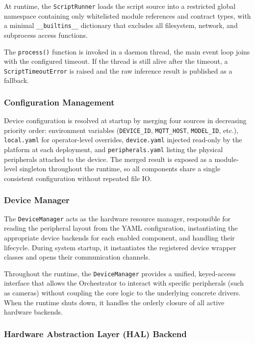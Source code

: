 At runtime, the \texttt{ScriptRunner} loads the script source into a restricted global namespace containing only whitelisted module references and contract types, with a minimal \texttt{\_\_builtins\_\_} dictionary that excludes all filesystem, network, and subprocess access functions. 

The \texttt{process()} function is invoked in a daemon thread, the main event loop joins with the configured timeout. If the thread is still alive after the timeout, a \texttt{ScriptTimeoutError} is raised and the raw inference result is published as a fallback.

\subsubsection{Configuration Management}\label{sec:impl:config}

Device configuration is resolved at startup by merging four sources in decreasing priority order: environment variables (\texttt{DEVICE\_ID}, \texttt{MQTT\_HOST}, \texttt{MODEL\_ID}, etc.), \texttt{local.yaml} for operator-level overrides, \texttt{device.yaml} injected read-only by the platform at each deployment, and \texttt{peripherals.yaml} listing the physical peripherals attached to the device. The merged result is exposed as a module-level singleton throughout the runtime, so all components share a single consistent configuration without repeated file \gls{IO}.

\subsubsection{Device Manager}\label{sec:impl:device_manager}

The \texttt{DeviceManager} acts as the hardware resource manager, responsible for reading the peripheral layout from the YAML configuration, instantiating the appropriate device backends for each enabled component, and handling their lifecycle. During system startup, it instantiates the registered device wrapper classes and opens their communication channels. 

Throughout the runtime, the \texttt{DeviceManager} provides a unified, keyed-access interface that allows the Orchestrator to interact with specific peripherals (such as cameras) without coupling the core logic to the underlying concrete drivers. When the runtime shuts down, it handles the orderly closure of all active hardware backends.


\subsubsection{Hardware Abstraction Layer (\texorpdfstring{\acrshort{HAL}}{HAL}) Backend}\label{sec:impl:halbackend}

